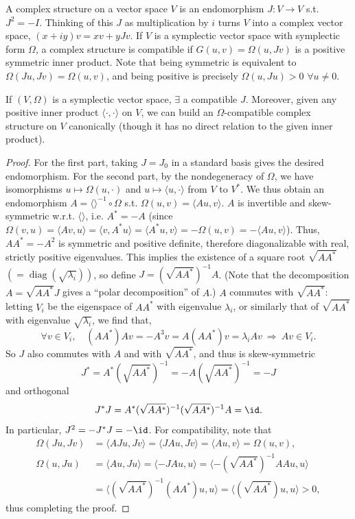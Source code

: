 
\begin{definition}
A complex structure on a vector space $V$ is an endomorphism $J:V\to V$ s.t. $J^2=-I$. Thinking of this $J$ as multiplication by $i$ turns $V$ into a complex vector space, $(x+iy)v=xv+yJv$. If $V$ is a symplectic vector space with symplectic form $\Omega$, a complex structure is compatible if $G(u,v)=\Omega(u,Jv)$ is a positive symmetric inner product. Note that being symmetric is equivalent to $\Omega(Ju,Jv)=\Omega(u,v)$, and being positive is precisely $\Omega(u,Ju)>0$ $\forall u\ne0$.
\end{definition}
\begin{proposition}
If $(V,\Omega)$ is a symplectic vector space, $\exists$ a compatible $J$. Moreover, given any positive inner product $\langle\cdot,\cdot\rangle$ on $V$, we can build an $\Omega$-compatible complex structure on $V$ canonically (though it has no direct relation to the given inner product).
\end{proposition}
\begin{proof}
For the first part, taking $J=J_0$ in a standard basis gives the desired endomorphism. For the second part, by the nondegeneracy of $\Omega$, we have isomorphisms $u\mapsto\Omega(u,\cdot)$ and $u\mapsto\langle u,\cdot\rangle$ from $V$ to $V^*$. We thus obtain an endomorphism $A=\langle\rangle^{-1}\circ\Omega$ s.t. $\Omega(u,v)=\langle Au,v\rangle$. $A$ is invertible and skew-symmetric w.r.t. $\langle\rangle$, i.e. $A^*=-A$ (since $\Omega(v,u)=\langle Av,u\rangle=\langle v,A^*u\rangle=\langle A^*u,v\rangle=-\Omega(u,v)=-\langle Au,v\rangle$). Thus, $AA^*=-A^2$ is symmetric and positive definite, therefore diagonalizable with real, strictly positive eigenvalues. This implies the existence of a square root $\sqrt{AA^*}$ $(=\operatorname{diag}(\sqrt{\lambda_i}))$, so define $J=(\sqrt{AA^*})^{-1}A$. (Note that the decomposition $A=\sqrt{AA^*}J$ gives a ``polar decomposition'' of $A$.) $A$ commutes with $\sqrt{AA^*}$: letting $V_i$ be the eigenspace of $AA^*$ with eigenvalue $\lambda_i$, or similarly that of $\sqrt{AA^*}$ with eigenvalue $\sqrt{\lambda_i}$, we find that,
\[\forall v\in V_i,\quad(AA^*)Av=-A^3v=A(AA^*)v=\lambda_iAv\ \Longrightarrow\ Av\in V_i.\]
So $J$ also commutes with $A$ and with $\sqrt{AA^*}$, and thus is skew-symmetric
\[J^*=A^*(\sqrt{AA^*})^{-1}=-A(\sqrt{AA^*})^{-1}=-J\]
and orthogonal
\[J^*J=A^*(\sqrt{AA^*})^{-1}(\sqrt{AA^*})^{-1}A=\id.\]
In particular, $J^2=-J^*J=-\id$. For compatibility, note that
\begin{align*}
\Omega(Ju,Jv)&=\langle AJu,Jv\rangle=\langle JAu,Jv\rangle=\langle Au,v\rangle=\Omega(u,v),\\
\Omega(u,Ju)&=\langle Au,Ju\rangle=\langle-JAu,u\rangle
=\langle-(\sqrt{AA^*})^{-1}AAu,u\rangle\\
&=\langle(\sqrt{AA^*})^{-1}(AA^*)u,u\rangle=\langle(\sqrt{AA^*})u,u\rangle>0,
\end{align*}
thus completing the proof.
\end{proof}
